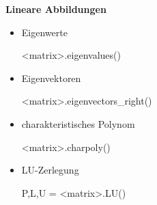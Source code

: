 \documentclass[a4paper,9pt,DIV15,twocolumn]{scrartcl}
\begin{document}
\textbf{Lineare Abbildungen}
\begin{itemize}
\item Eigenwerte
\begin{sagein}
<matrix>.eigenvalues()
\end{sagein}
 \item Eigenvektoren
\begin{sagein}
<matrix>.eigenvectors_right()
\end{sagein}
\item charakteristisches Polynom
\begin{sagein}
<matrix>.charpoly() 
\end{sagein}
\item LU-Zerlegung 
    \begin{sagein}
P,L,U = <matrix>.LU()
    \end{sagein}
\end{itemize}
\end{document}
